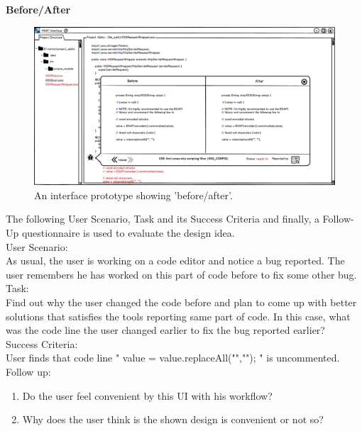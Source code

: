 \textbf{Before/After}
\begin{figure}[hbt!]
	\centering
	\includegraphics[width=\linewidth]{figures/solution_ideas_snaps/S23_before_after}
	\caption{An interface prototype showing 'before/after'.}
	\label{fig:S23_before_after}
\end{figure}

The following User Scenario, Task and its Success Criteria and finally, a Follow-Up questionnaire is used to evaluate the design idea. \\

User Scenario: \\

As usual, the user is working on a code editor and notice a bug reported. The user remembers he has worked on this part of code before to fix some other bug. \\
 
Task: \\

Find out why the user changed the code before and plan to come up with better solutions that satisfies the tools reporting same part of code. In this case, what was the code line the user changed earlier to fix the bug reported earlier? \\
\clearpage
Success Criteria: \\

User finds that code line " value = value.replaceAll("",""); " is uncommented. \\

Follow up: \\

\begin{enumerate}
\item Do the user feel convenient by this UI with his workflow?
\item Why does the user think is the shown design is convenient or not so?
\end{enumerate}

